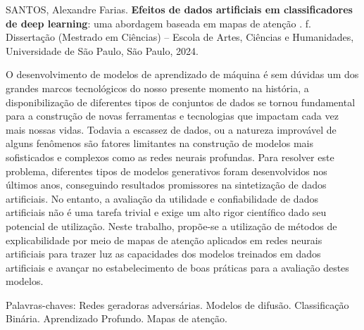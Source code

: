 
\setlength{\absparsep}{18pt} %
\begin{resumo}

% 
%
% 
%
\begin{flushleft}
SANTOS, Alexandre Farias.
\textbf{Efeitos de dados artificiais em classificadores de deep learning}: uma abordagem baseada em mapas de atenção \imprimirdata. \pageref{LastPage} f. Dissertação (Mestrado em Ciências) – Escola de Artes, Ciências e Humanidades, Universidade de São Paulo, São Paulo, 2024.
\end{flushleft}

O desenvolvimento de modelos de aprendizado de máquina é sem dúvidas um dos grandes marcos tecnológicos do nosso presente momento na história, a disponibilização de diferentes tipos de conjuntos de dados se tornou fundamental para a construção de novas ferramentas e tecnologias que impactam cada vez mais nossas vidas. Todavia a escassez de dados, ou a natureza improvável de alguns fenômenos são fatores limitantes na construção de modelos mais sofisticados e complexos como as redes neurais profundas. Para resolver este problema, diferentes tipos de modelos generativos foram desenvolvidos nos últimos anos, conseguindo resultados promissores na sintetização de dados artificiais. No entanto, a avaliação da utilidade e confiabilidade de dados artificiais não é uma tarefa trivial e exige um alto rigor científico dado seu potencial de utilização. Neste trabalho, propõe-se a utilização de métodos de explicabilidade por meio de mapas de atenção aplicados em redes neurais artificiais para trazer luz as capacidades dos modelos treinados em dados artificiais e avançar no estabelecimento de boas práticas para a avaliação destes modelos.

Palavras-chaves: Redes geradoras adversárias. Modelos de difusão. Classificação Binária. Aprendizado Profundo. Mapas de atenção.
\end{resumo}

